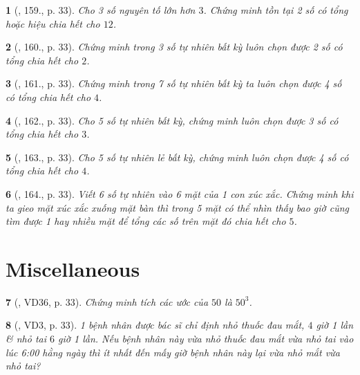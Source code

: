 \documentclass{article}
\newtheorem{baitoan}{}
\begin{document}
\begin{baitoan}[\cite{Tuyen_Toan_6}, 159., p. 33]
	Cho 3 số nguyên tố lớn hơn $3$. Chứng minh tồn tại 2 số có tổng hoặc hiệu chia hết cho $12$.
\end{baitoan}

\begin{baitoan}[\cite{Tuyen_Toan_6}, 160., p. 33]
	Chứng minh trong 3 số tự nhiên bất kỳ luôn chọn được 2 số có tổng chia hết cho $2$.
\end{baitoan}

\begin{baitoan}[\cite{Tuyen_Toan_6}, 161., p. 33]
	Chứng minh trong 7 số tự nhiên bất kỳ ta luôn chọn được 4 số có tổng chia hết cho $4$.
\end{baitoan}

\begin{baitoan}[\cite{Tuyen_Toan_6}, 162., p. 33]
	Cho 5 số tự nhiên bất kỳ, chứng minh luôn chọn được 3 số có tổng chia hết cho $3$.
\end{baitoan}

\begin{baitoan}[\cite{Tuyen_Toan_6}, 163., p. 33]
	Cho 5 số tự nhiên lẻ bất kỳ, chứng minh luôn chọn được 4 số có tổng chia hết cho $4$.
\end{baitoan}

\begin{baitoan}[\cite{Tuyen_Toan_6}, 164., p. 33]
	Viết 6 số tự nhiên vào 6 mặt của 1 con xúc xắc. Chứng minh khi ta gieo mặt xúc xắc xuống mặt bàn thì trong 5 mặt có thể nhìn thấy bao giờ cũng tìm được 1 hay nhiều mặt để tổng các số trên mặt đó chia hết cho $5$.
\end{baitoan}


\section{Miscellaneous}

\begin{baitoan}[\cite{Tuyen_Toan_6}, VD36, p. 33]
	Chứng minh tích các ước của $50$ là $50^3$.
\end{baitoan}

\begin{baitoan}[\cite{Tuyen_Toan_6}, VD3, p. 33]
	1 bệnh nhân được bác sĩ chỉ định nhỏ thuốc đau mắt, $4$ giờ 1 lần \& nhỏ tai $6$ giờ 1 lần. Nếu bệnh nhân này vừa nhỏ thuốc đau mắt vừa nhỏ tai vào lúc {\rm6:00} hằng ngày thì ít nhất đến mấy giờ bệnh nhân này lại vừa nhỏ mắt vừa nhỏ tai?
\end{baitoan}
\end{document}

